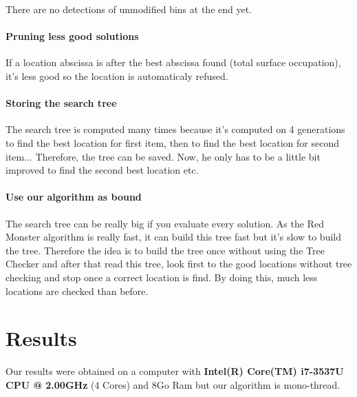 \documentclass{article}
\begin{document}
There are no detections of unmodified bins at the end yet.

    \paragraph{Pruning less good solutions}
If a location abscissa is after the best abscissa found (total surface occupation), it's less good so the location is automaticaly refused.

    \paragraph{Storing the search tree}
The search tree is computed many times because it's computed on 4 generations to find the best location for first item, then to find the best location for second item... Therefore, the tree can be saved. Now, he only has to be a little bit improved to find the second best location etc.

    \paragraph{Use our algorithm as bound}
The search tree can be really big if you evaluate every solution. As the Red Monster algorithm is really fast, it can build this tree fast but it's slow to build the tree. Therefore the idea is to build the tree once without using the Tree Checker and after that read this tree, look first to the good locations without tree checking and stop once a correct location is find. By doing this, much less locations are checked than before.

\section{Results}


    

        
        Our results were obtained on a computer with \textbf{Intel(R) Core(TM) i7-3537U CPU @ 2.00GHz} (4 Cores) and 8Go Ram but our algorithm is mono-thread.

        
    
\end{document}
